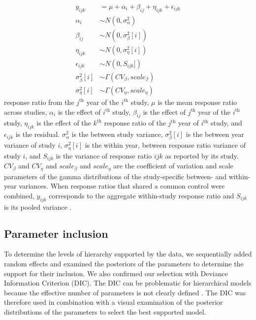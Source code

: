 \documentclass{article}\usepackage[]{graphicx}\usepackage[]{color}
\begin{document}
\begin{equation}
  \begin{split}
    \label{eq:fullModel}
    y_{ijk} &= \mu + \alpha_i + \beta_{ij} +  \eta_{ijk} +
    \epsilon_{ijk}  \\
    \alpha_{i} &\sim N(0, \sigma^2_{\alpha})\\
    \beta_{ij} &\sim N(0, \sigma^2_{\beta}[i])\\
    \eta_{ijk} &\sim N(0, \sigma^2_{\eta}[i])\\
    \epsilon_{ijk} &\sim N(0, S_{ijk}])\\
    \sigma^2_{\beta}[i] &\sim \Gamma(CV_\beta, scale_\beta)\\
    \sigma^2_{\eta}[i] &\sim \Gamma(CV_\eta, scale_\eta)
  \end{split}
\end{equation}
response ratio from the $j^{\mathrm{th}}$ year of the
$i^{\mathrm{th}}$ study, $\mu$ is the mean response ratio across
studies, $\alpha_{i}$ is the effect of $i^{\mathrm{th}}$ study,
$\beta_{ij}$ is the effect of $j^{\mathrm{th}}$ year of the
$i^{\mathrm{th}}$ study, $\eta_{ijk}$ is the effect of the
$k^{\mathrm{th}}$ response ratio of the $j^{\mathrm{th}}$ year of
$i^{\mathrm{th}}$ study, and $\epsilon_{ijk}$ is the
residual. $\sigma^2_{\alpha}$ is the between study variance,
$\sigma^2_{\beta}[i]$ is the between year variance of study $i$,
$\sigma^2_{\eta}[i]$ is the within year, between response ratio
variance of study $i$, and $S_{ijk}$ is the variance of response ratio
$ijk$ as reported by its study. $CV_\beta$ and $CV_\eta$ and
$scale_\beta$ and $scale_\eta$ are the coefficient of variation and
scale parameters of the gamma distributions of the study-specific
between- and within-year variances.  When response ratios that shared
a common control were combined, $y_{ijk}$ corresponds to the aggregate
within-study response ratio \citep[Eq.~3,][]{Lajeunesse2011} and
$S_{ijk}$ is its pooled variance \citep[Eq.~8,][]{Lajeunesse2011}.

\subsection{Parameter inclusion}
To determine the levels of hierarchy supported by the data, we
sequentially added random effects and examined the posteriors of the
parameters to determine the support for their inclusion. We also
confirmed our selection with Deviance Information Criterion (DIC). The
DIC can be problematic for hierarchical models because the effective
number of parameters is not clearly defined \citep{gelman2006data,
kery2012bayesian}. The DIC was therefore used in combination with a
visual examination of the posterior distributions of the parameters to
select the best supported model.
\end{document}
